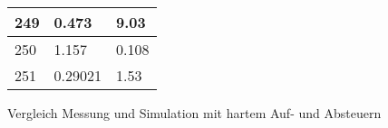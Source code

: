 \begin{appendix}
\begin{figure}[ht!]
\begin{minipage}[b]{0.4\textwidth}
\begin{tabular}{|l|l|l|}
			249                                                             & 0.473                                                            & 9.03                                                          \\ \hline
			250                                                             & 1.157                                                            & 0.108                                                         \\ \hline
			251                                                             & 0.29021                                                          & 1.53                                                          \\ \hline
		\end{tabular}
		\caption{Vergleich Messung und Simulation mit hartem Auf- und Absteuern}\label{tab:Vergleich_hart_AufAb}
	\end{minipage}
\end{figure}



\end{appendix}

